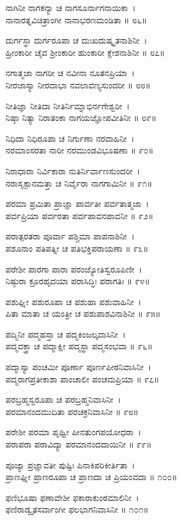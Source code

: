 ನಾಗಿನೀ ನಾಗಕನ್ಯಾ ಚ ನಾಗಸೂರ್ನಾಗನಾಯಿಕಾ~।\\
ನಾನಾರತ್ನವಿಚಿತ್ರಾಂಗೀ ನಾನಾಭರಣಮಂಡಿತಾ ॥ ೮೬॥

ದುರ್ಗಸ್ಥಾ ದುರ್ಗರೂಪಾ ಚ ದುಃಖದುಷ್ಕೃತನಾಶಿನೀ~।\\
ಹ್ರೀಂಕಾರೀ ಚೈವ ಶ್ರೀಂಕಾರೀ ಹುಂಕಾರೀ ಕ್ಲೇಶನಾಶಿನೀ ॥ ೮೭॥

ನಗಾತ್ಮಜಾ ನಾಗರೀ ಚ ನವೀನಾ ನೂತನಪ್ರಿಯಾ~।\\
ನೀರಜಾಸ್ಯಾ ನೀರದಾಭಾ ನವಲಾವಣ್ಯಸುಂದರೀ ॥ ೮೮॥

ನೀತಿಜ್ಞಾ ನೀತಿದಾ ನೀತಿರ್ನಿಮ್ನಾಭಿರ್ನಗೇಶ್ವರೀ~।\\
ನಿಷ್ಠಾ ನಿತ್ಯಾ ನಿರಾತಂಕಾ ನಾಗಯಜ್ಞೋಪವೀತಿನೀ ॥ ೮೯॥

ನಿಧಿದಾ ನಿಧಿರೂಪಾ ಚ ನಿರ್ಗುಣಾ ನರವಾಹಿನೀ~।\\
ನರಮಾಂಸರತಾ ನಾರೀ ನರಮುಂಡವಿಭೂಷಣಾ ॥ ೯೦॥

ನಿರಾಧಾರಾ ನಿರ್ವಿಕಾರಾ ನುತಿರ್ನಿರ್ವಾಣಸುಂದರೀ~।\\
ನರಾಸೃಕ್ಪಾನಮತ್ತಾ ಚ ನಿರ್ವೈರಾ ನಾಗಗಾಮಿನೀ ॥ ೯೧॥

ಪರಮಾ ಪ್ರಮಿತಾ ಪ್ರಾಜ್ಞಾ ಪಾರ್ವತೀ ಪರ್ವತಾತ್ಮಜಾ~।\\
ಪರ್ವಪ್ರಿಯಾ ಪರ್ವರತಾ ಪರ್ವಪಾವನಪಾವನೀ ॥ ೯೨॥

ಪರಾತ್ಪರತರಾ ಪೂರ್ವಾ ಪಶ್ಚಿಮಾ ಪಾಪನಾಶಿನೀ~।\\
ಪಶೂನಾಂ ಪತಿಪತ್ನೀ ಚ ಪತಿಭಕ್ತಿಪರಾಯಣಾ ॥ ೯೩॥

ಪರೇಶೀ ಪಾರಗಾ ಪಾರಾ ಪರಂಜ್ಯೋತಿಸ್ವರೂಪಿಣೀ~।\\
ನಿಷ್ಠುರಾ ಕ್ರೂರಹೃದಯಾ ಪರಾಸಿದ್ಧಿಃ ಪರಾಗತಿಃ ॥ ೯೪॥

ಪಶುಘ್ನೀ ಪಶುರೂಪಾ ಚ ಪಶುಹಾ ಪಶುವಾಹಿನೀ~।\\
ಪಿತಾ ಮಾತಾ ಚ ಯಂತ್ರೀ ಚ ಪಶುಪಾಶವಿನಾಶಿನೀ ॥ ೯೫॥

ಪದ್ಮಿನೀ ಪದ್ಮಹಸ್ತಾ ಚ ಪದ್ಮಕಿಂಜಲ್ಕವಾಸಿನೀ~।\\
ಪದ್ಮವಕ್ತ್ರಾ ಚ ಪದ್ಮಾಕ್ಷೀ ಪದ್ಮಸ್ಥಾ ಪದ್ಮಸಂಭವಾ ॥ ೯೬॥

ಪದ್ಮಾಸ್ಯಾ ಪಂಚಮೀ ಪೂರ್ಣಾ ಪೂರ್ಣಪೀಠನಿವಾಸಿನೀ~।\\
ಪದ್ಮರಾಗಪ್ರತೀಕಾಶಾ ಪಾಂಚಾಲೀ ಪಂಚಮಪ್ರಿಯಾ ॥ ೯೭॥

ಪರಬ್ರಹ್ಮಸ್ವರೂಪಾ ಚ ಪರಬ್ರಹ್ಮನಿವಾಸಿನೀ~।\\
ಪರಮಾನಂದಮುದಿತಾ ಪರಚಕ್ರನಿವಾಸಿನೀ ॥ ೯೮॥

ಪರೇಶೀ ಪರಮಾ ಪೃಥ್ವೀ ಪೀನತುಂಗಪಯೋಧರಾ~।\\
ಪರಾಪರಾ ಪರಾವಿದ್ಯಾ ಪರಮಾನಂದದಾಯಿನೀ ॥ ೯೯॥

ಪೂಜ್ಯಾ ಪ್ರಜ್ಞಾವತೀ ಪುಷ್ಟಿಃ ಪಿನಾಕಿಪರಿಕೀರ್ತಿತಾ~।\\
ಪ್ರಾಣಘ್ನೀ ಪ್ರಾಣರೂಪಾ ಚ ಪ್ರಾಣದಾ ಚ ಪ್ರಿಯಂವದಾ ॥ ೧೦೦॥

ಫಣಿಭೂಷಾ ಫಣಾವೇಶೀ ಫಕಾರಾಕುಂಠಮಾಲಿನೀ~।\\
ಫಣಿರಾಡ್ವೃತಸರ್ವಾಂಗೀ ಫಲಭಾಗನಿವಾಸಿನೀ ॥ ೧೦೧॥

